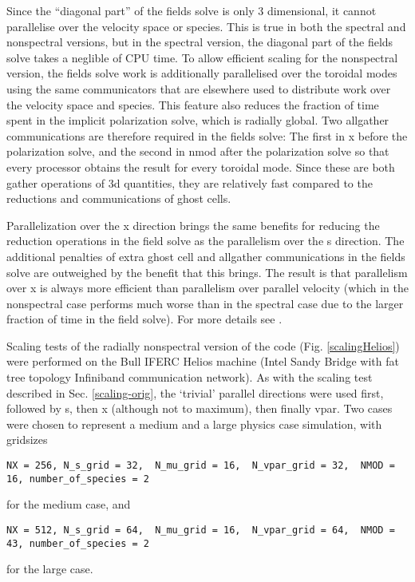 Since the ``diagonal part'' of the fields solve is only 3 dimensional, it cannot parallelise over the velocity space or species.   This is true in both the spectral and nonspectral
versions, but in the spectral version, the diagonal part of the fields solve takes a neglible of CPU time.  To allow efficient scaling for the nonspectral version, the fields solve 
work is additionally parallelised over the toroidal modes using the same communicators that are elsewhere used to distribute work over the velocity space and species. 
This feature also reduces the fraction of time spent in the implicit polarization solve, which is radially global. Two allgather communications are therefore required in the fields
solve: The first in x before the polarization solve, and the second in nmod after the polarization solve so that every processor obtains the result for every toroidal mode. 
Since these are both gather operations of 3d quantities, they are relatively fast compared to the reductions and communications of ghost cells.  

Parallelization over the x direction brings the same benefits for reducing the reduction operations in the field solve as the parallelism over the s direction. The additional
penalties of extra ghost cell and allgather communications in the fields solve are outweighed by the benefit that this brings.  The result is that parallelism over x is always more
efficient than parallelism over parallel velocity (which in the nonspectral case performs much worse than in the spectral case due to the larger fraction of time in the field
solve).  For more details see .

Scaling tests of the radially nonspectral version of the code (Fig. \ref{scalingHelios}) were performed on the Bull IFERC Helios machine (Intel Sandy Bridge with fat tree topology Infiniband
communication network).  As with the scaling test described in Sec. \ref{scaling-orig}, the `trivial' parallel directions were used first, followed by s, then x (although not to maximum), then finally vpar.
Two cases were chosen to represent a medium and a large physics case simulation, with gridsizes
\begin{verbatim}
NX = 256, N_s_grid = 32,  N_mu_grid = 16,  N_vpar_grid = 32,  NMOD = 16, number_of_species = 2
\end{verbatim}
for the medium case, and 
\begin{verbatim}
NX = 512, N_s_grid = 64,  N_mu_grid = 16,  N_vpar_grid = 64,  NMOD = 43, number_of_species = 2
\end{verbatim}
for the large case.

